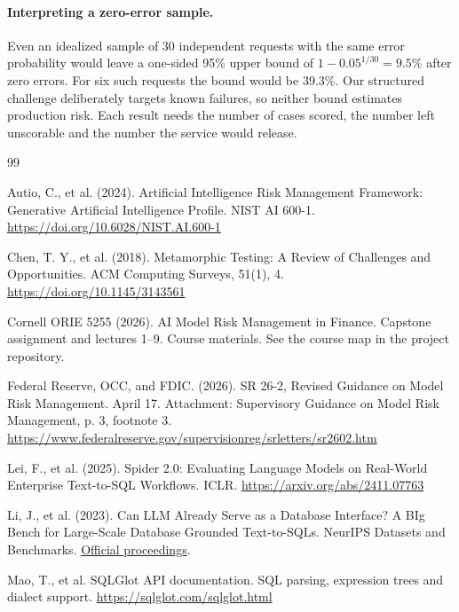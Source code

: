 \documentclass[11pt,a4paper,onecolumn,oneside]{rho-class/rho}
\begin{document}
\medskip
\paragraph{Interpreting a zero-error sample.}
Even an idealized sample of 30 independent requests with the same error probability would leave a one-sided 95\% upper bound of $1-0.05^{1/30}=9.5\%$ after zero errors. For six such requests the bound would be 39.3\%. Our structured challenge deliberately targets known failures, so neither bound estimates production risk. Each result needs the number of cases scored, the number left unscorable and the number the service would release.

\clearpage
{}
{}
\begin{thebibliography}{99}
\small


 Autio, C., et al. (2024). Artificial Intelligence Risk Management Framework: Generative Artificial Intelligence Profile. NIST AI 600-1. \url{https://doi.org/10.6028/NIST.AI.600-1}

 Chen, T. Y., et al. (2018). Metamorphic Testing: A Review of Challenges and Opportunities. ACM Computing Surveys, 51(1), 4. \url{https://doi.org/10.1145/3143561}

 Cornell ORIE 5255 (2026). AI Model Risk Management in Finance. Capstone assignment and lectures 1--9. Course materials. See the course map in the project repository.

 Federal Reserve, OCC, and FDIC. (2026). SR 26-2, Revised Guidance on Model Risk Management. April 17. Attachment: Supervisory Guidance on Model Risk Management, p. 3, footnote 3. \url{https://www.federalreserve.gov/supervisionreg/srletters/sr2602.htm}

 Lei, F., et al. (2025). Spider 2.0: Evaluating Language Models on Real-World Enterprise Text-to-SQL Workflows. ICLR. \url{https://arxiv.org/abs/2411.07763}

 Li, J., et al. (2023). Can LLM Already Serve as a Database Interface? A BIg Bench for Large-Scale Database Grounded Text-to-SQLs. NeurIPS Datasets and Benchmarks. \href{https://proceedings.neurips.cc/paper_files/paper/2023/hash/83fc8fab1710363050bbd1d4b8cc0021-Abstract-Datasets_and_Benchmarks.html}{Official proceedings}.

 Mao, T., et al. SQLGlot API documentation. SQL parsing, expression trees and dialect support. \url{https://sqlglot.com/sqlglot.html}


\end{thebibliography}
\end{document}
